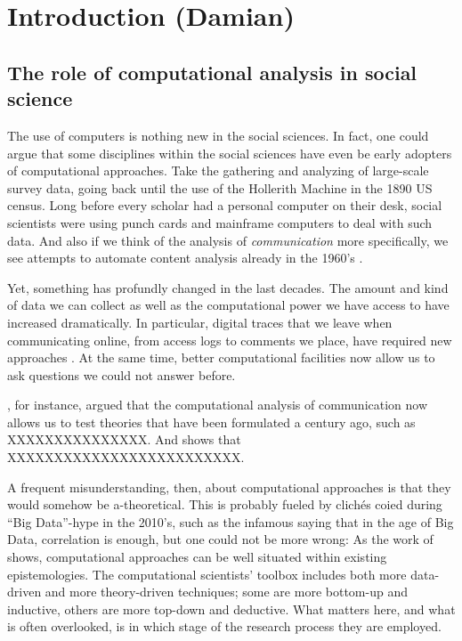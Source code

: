 \chapter{Introduction (Damian)}
\label{chap:introduction}


\section{The role of computational analysis in social science}
The use of computers is nothing new in the social sciences. In fact,
one could argue that some disciplines within the social sciences have
even be early adopters of computational approaches. Take the
gathering and analyzing of large-scale survey data, going back until
the use of the Hollerith Machine in the 1890 US census. Long before
every scholar had a personal computer on their desk, social scientists
were using punch cards and mainframe computers to deal with such
data. And also if we think of the analysis of \emph{communication}
more specifically, we see attempts to automate content analysis
already in the 1960's \citep[see, e.g.,]{Scharkow2017}.

Yet, something has profundly changed in the last decades. The amount
and kind of data we can collect as well as the computational power we
have access to have increased dramatically. In particular, digital
traces that we leave when communicating online, from access logs to
comments we place, have required new approaches \citep[see,
  e.g.,]{Trilling2017b}. At the same time, better computational
facilities now allow us to ask questions we could not answer before.

\citet{Gonzalez-Bailon2017}, for instance, argued that the
computational analysis of communication now allows us to test theories
that have been formulated a century ago, such as XXXXXXXXXXXXXXX. And
\citet{Salganik2019} shows that XXXXXXXXXXXXXXXXXXXXXXXXX.

A frequent misunderstanding, then, about computational approaches is
that they would somehow be a-theoretical. This is probably fueled by
clich\'{e}s coied during ``Big Data''-hype in the 2010's, such as the
infamous saying that in the age of Big Data, correlation is enough,
but one could not be more wrong: As the work of
\cite{Kitchin2014,Kitchen2014data} shows, computational approaches can
be well situated within existing epistemologies. The computational
scientists' toolbox includes both more data-driven and more
theory-driven techniques; some are more bottom-up and inductive,
others are more top-down and deductive. What matters here, and what is
often overlooked, is in which stage of the research process they are
employed.

